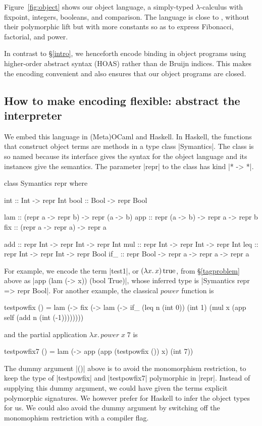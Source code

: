 \documentclass[preprint]{sigplanconf}
\newcommand{\fun}[1]{\mathopen{\lambda\mathord{#1}.\,}}
\newcommand{\True}{\mathinner{\mathrm{true}}}
\begin{document}
Figure~\ref{fig:object} shows our object language, a simply-typed
$\lambda$-calculus with fixpoint, integers, booleans, and comparison.
The language is close to , without their polymorphic
lift but with more constants so as to express Fibonacci, factorial, and
power.

In contrast to \S\ref{intro}, we henceforth encode 
binding in object programs using higher-order
abstract syntax (HOAS) \citep{miller-manipulating,pfenning-higher-order}
rather than de Bruijn indices. This makes the encoding convenient and
also ensures that our object programs are closed.

\subsection{How to make encoding flexible: abstract the interpreter}
\label{encoding}

We embed this language in (Meta)OCaml and Haskell.  In Haskell,
the functions that construct object terms are methods in a type class
|Symantics|. The class is so named because its interface gives the syntax for
the object language and its instances give the semantics.
The parameter |repr| to the class has kind |* -> *|.
\begin{code}
class Symantics repr where

  int  :: Int  -> repr Int
  bool :: Bool -> repr Bool

  lam :: (repr a -> repr b) -> repr (a -> b)
  app :: repr (a -> b) -> repr a -> repr b
  fix :: (repr a -> repr a) -> repr a

  add :: repr Int -> repr Int -> repr Int
  mul :: repr Int -> repr Int -> repr Int
  leq :: repr Int -> repr Int -> repr Bool
  if_ :: repr Bool -> repr a -> repr a -> repr a
\end{code}
For example, we encode the term |test1|, or $(\fun{x}x)\True$, from
\S\ref{tagproblem} above as |app (lam (\x -> x)) (bool True)|,
whose inferred type is |Symantics repr => repr Bool|.
For another example, the classical $\mathit{power}$ function is
\begin{code}
testpowfix () = 
  lam (\x -> fix (\self -> lam (\n ->
  if_ (leq n (int 0)) (int 1)
      (mul x (app self (add n (int (-1))))))))
\end{code}
and the partial application $\fun{x} \mathit{power}\;x\;7$ is
\begin{code}
testpowfix7 () = 
 lam (\x -> app (app (testpowfix ()) x) (int 7))
\end{code}
The dummy argument |()| above is to avoid the monomorphism
restriction, to keep the type of |testpowfix| and |testpowfix7|
polymorphic in |repr|. Instead of supplying this dummy
argument, we could have given the terms explicit polymorphic
signatures.  We however prefer for
Haskell to infer the object types for us. We could also
avoid the dummy argument by switching off the monomophism restriction
with a compiler flag.
\end{document}
